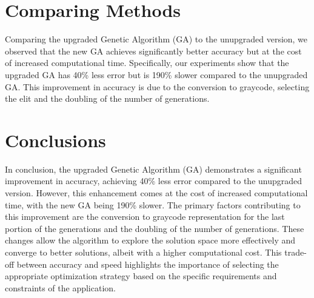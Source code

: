 \documentclass{article}
\begin{document}
\section{Comparing Methods}
Comparing the upgraded Genetic Algorithm (GA) to the unupgraded version, we observed that the new GA achieves significantly better accuracy but at the cost of increased computational time. Specifically, our experiments show that the upgraded GA has 40\% less error but is 190\% slower compared to the unupgraded GA. This improvement in accuracy is due to the conversion to graycode, selecting the elit and the doubling of the number of generations.

\section{Conclusions}
In conclusion, the upgraded Genetic Algorithm (GA) demonstrates a significant improvement in accuracy, achieving 40\% less error compared to the unupgraded version. However, this enhancement comes at the cost of increased computational time, with the new GA being 190\% slower. The primary factors contributing to this improvement are the conversion to graycode representation for the last portion of the generations and the doubling of the number of generations. These changes allow the algorithm to explore the solution space more effectively and converge to better solutions, albeit with a higher computational cost. This trade-off between accuracy and speed highlights the importance of selecting the appropriate optimization strategy based on the specific requirements and constraints of the application.
\end{document}
